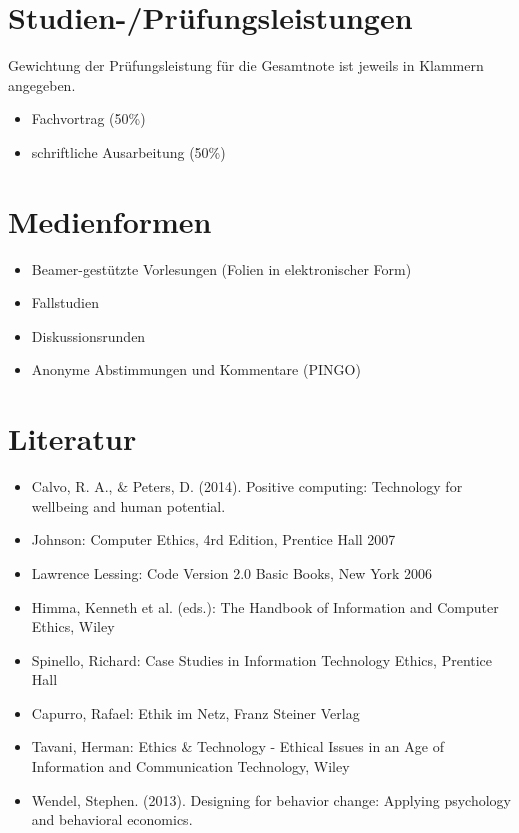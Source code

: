 \section*{Studien-/Prüfungsleistungen\label{/mi-2017/modulbeschreibungen-master/MA_All_Computerethik}}\label{studien-pruxfcfungsleistungenpathlabelmi-2017modulbeschreibungen-mastermaux5fallux5fcomputerethik}

Gewichtung der Prüfungsleistung für die Gesamtnote ist jeweils in
Klammern angegeben.

\begin{itemize}
\tightlist
\item
  Fachvortrag (50\%)
\item
  schriftliche Ausarbeitung (50\%)
\end{itemize}

\section*{Medienformen\label{/mi-2017/modulbeschreibungen-master/MA_All_Computerethik}}\label{medienformenpathlabelmi-2017modulbeschreibungen-mastermaux5fallux5fcomputerethik}

\begin{itemize}
\tightlist
\item
  Beamer-gestützte Vorlesungen (Folien in elektronischer Form)
\item
  Fallstudien
\item
  Diskussionsrunden
\item
  Anonyme Abstimmungen und Kommentare (PINGO)
\end{itemize}

\section*{Literatur\label{/mi-2017/modulbeschreibungen-master/MA_All_Computerethik}}\label{literaturpathlabelmi-2017modulbeschreibungen-mastermaux5fallux5fcomputerethik}

\begin{itemize}
\tightlist
\item
  Calvo, R. A., \& Peters, D. (2014). Positive computing: Technology for
  wellbeing and human potential.
\item
  Johnson: Computer Ethics, 4rd Edition, Prentice Hall 2007
\item
  Lawrence Lessing: Code Version 2.0 Basic Books, New York 2006
\item
  Himma, Kenneth et al. (eds.): The Handbook of Information and Computer
  Ethics, Wiley
\item
  Spinello, Richard: Case Studies in Information Technology Ethics,
  Prentice Hall
\item
  Capurro, Rafael: Ethik im Netz, Franz Steiner Verlag
\item
  Tavani, Herman: Ethics \& Technology - Ethical Issues in an Age of
  Information and Communication Technology, Wiley
\item
  Wendel, Stephen. (2013). Designing for behavior change: Applying
  psychology and behavioral economics.
\end{itemize}

